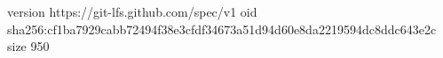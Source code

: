 version https://git-lfs.github.com/spec/v1
oid sha256:cf1ba7929cabb72494f38e3cfdf34673a51d94d60e8da2219594dc8ddc643e2c
size 950
